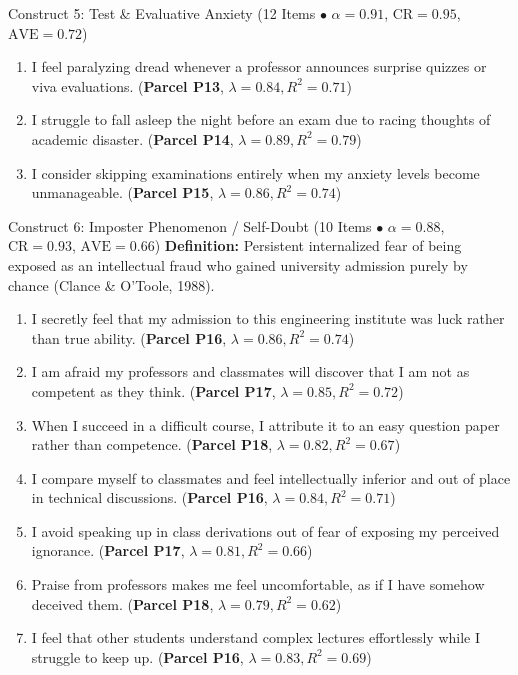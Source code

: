 \documentclass[10pt,a4paper]{article}
\begin{document}
\begin{constructbox}{Construct 5: Test \& Evaluative Anxiety (12 Items $\bullet$ $\alpha = 0.91$, $\text{CR} = 0.95$, $\text{AVE} = 0.72$)}
\begin{enumerate}[label=\textbf{Q\arabic*.}, leftmargin=2.5em, itemsep=2pt, resume]
  \item I feel paralyzing dread whenever a professor announces surprise quizzes or viva evaluations. \hfill (\textbf{Parcel P13}, $\lambda = 0.84, R^2 = 0.71$)
  \item I struggle to fall asleep the night before an exam due to racing thoughts of academic disaster. \hfill (\textbf{Parcel P14}, $\lambda = 0.89, R^2 = 0.79$)
  \item I consider skipping examinations entirely when my anxiety levels become unmanageable. \hfill (\textbf{Parcel P15}, $\lambda = 0.86, R^2 = 0.74$)
\end{enumerate}
\end{constructbox}

\newpage
\begin{constructbox}{Construct 6: Imposter Phenomenon / Self-Doubt (10 Items $\bullet$ $\alpha = 0.88$, $\text{CR} = 0.93$, $\text{AVE} = 0.66$)}
\textbf{Definition:} Persistent internalized fear of being exposed as an intellectual fraud who gained university admission purely by chance (Clance \& O'Toole, 1988).
\begin{enumerate}[label=\textbf{Q\arabic*.}, leftmargin=2.5em, itemsep=2pt, resume]
  \item I secretly feel that my admission to this engineering institute was luck rather than true ability. \hfill (\textbf{Parcel P16}, $\lambda = 0.86, R^2 = 0.74$)
  \item I am afraid my professors and classmates will discover that I am not as competent as they think. \hfill (\textbf{Parcel P17}, $\lambda = 0.85, R^2 = 0.72$)
  \item When I succeed in a difficult course, I attribute it to an easy question paper rather than competence. \hfill (\textbf{Parcel P18}, $\lambda = 0.82, R^2 = 0.67$)
  \item I compare myself to classmates and feel intellectually inferior and out of place in technical discussions. \hfill (\textbf{Parcel P16}, $\lambda = 0.84, R^2 = 0.71$)
  \item I avoid speaking up in class derivations out of fear of exposing my perceived ignorance. \hfill (\textbf{Parcel P17}, $\lambda = 0.81, R^2 = 0.66$)
  \item Praise from professors makes me feel uncomfortable, as if I have somehow deceived them. \hfill (\textbf{Parcel P18}, $\lambda = 0.79, R^2 = 0.62$)
  \item I feel that other students understand complex lectures effortlessly while I struggle to keep up. \hfill (\textbf{Parcel P16}, $\lambda = 0.83, R^2 = 0.69$)

\end{enumerate}
\end{constructbox}
\end{document}

